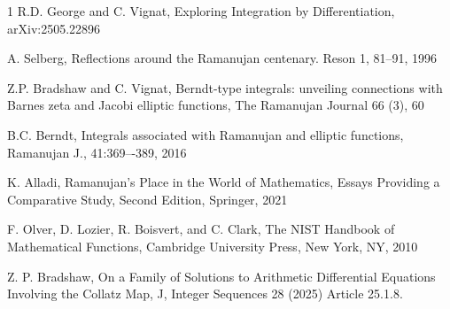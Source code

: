 \documentclass[11pt,oneside,reqno]{article}
\theoremstyle{definition}
\begin{document}
\begin{thebibliography}{1}
R.D. George and C. Vignat,
Exploring Integration by Differentiation,
arXiv:2505.22896

A. Selberg, Reflections around the Ramanujan centenary. Reson 1, 81--91, 1996

Z.P. Bradshaw and C. Vignat,
Berndt-type integrals: unveiling connections with Barnes zeta and Jacobi elliptic functions,
The Ramanujan Journal 66 (3), 60

B.C. Berndt, Integrals associated with Ramanujan and elliptic functions, Ramanujan J., 41:369–-389, 2016

K. Alladi, Ramanujan’s Place in the World of Mathematics, Essays Providing a Comparative Study, Second Edition, Springer, 2021

F. Olver, D. Lozier, R. Boisvert, and C. Clark,  The NIST Handbook of Mathematical Functions, Cambridge University Press, New York, NY, 2010

Z. P. Bradshaw, On a Family of Solutions to Arithmetic Differential Equations Involving the Collatz Map, J, Integer Sequences 28 (2025) Article 25.1.8.

\end{thebibliography}
\end{document}
